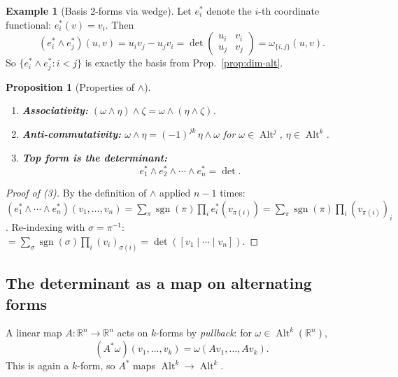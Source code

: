 \documentclass[11pt]{article}
\theoremstyle{definition}
\newtheorem{example}{Example}[section]
\theoremstyle{plain}
\newtheorem{proposition}{Proposition}[section]
\begin{document}
\begin{example}[Basis 2-forms via wedge]
  Let $e_i^*$ denote the $i$-th coordinate functional:
  $e_i^*(v) = v_i$.  Then
  \[
    (e_i^*\wedge e_j^*)(u,v)
    = u_iv_j - u_jv_i
    = \det\begin{pmatrix}u_i & v_i \\ u_j & v_j\end{pmatrix}
    = \omega_{\{i,j\}}(u,v).
  \]
  So $\{e_i^*\wedge e_j^* : i<j\}$ is exactly the basis from
  Prop.~\ref{prop:dim-alt}.
\end{example}

\begin{proposition}[Properties of $\wedge$]
  \leavevmode
  \begin{enumerate}
    \item \textbf{Associativity:}
          $(\omega\wedge\eta)\wedge\zeta = \omega\wedge(\eta\wedge\zeta)$.
    \item \textbf{Anti-commutativity:}
          $\omega\wedge\eta = (-1)^{jk}\,\eta\wedge\omega$
          for $\omega\in\operatorname{Alt}^j$, $\eta\in\operatorname{Alt}^k$.
    \item \textbf{Top form is the determinant:}
          \[
            e_1^*\wedge e_2^*\wedge\cdots\wedge e_n^* = \det.
          \]
  \end{enumerate}
\end{proposition}
\begin{proof}[Proof of (3)]
  By the definition of $\wedge$ applied $n-1$ times:
  $(e_1^*\wedge\cdots\wedge e_n^*)(v_1,\ldots,v_n)
  = \sum_\pi \operatorname{sgn}(\pi)\prod_i e_i^*(v_{\pi(i)})
  = \sum_\pi \operatorname{sgn}(\pi)\prod_i (v_{\pi(i)})_i$.
  Re-indexing with $\sigma=\pi^{-1}$:
  $= \sum_\sigma \operatorname{sgn}(\sigma)\prod_i (v_i)_{\sigma(i)}
  = \det([v_1\mid\cdots\mid v_n])$.
\end{proof}

\subsection{The determinant as a map on alternating forms}

A linear map $A:\mathbb{R}^n\to\mathbb{R}^n$ acts on $k$-forms by
\emph{pullback}: for $\omega\in\operatorname{Alt}^k(\mathbb{R}^n)$,
\[
  (A^*\omega)(v_1,\ldots,v_k) = \omega(Av_1,\ldots,Av_k).
\]
This is again a $k$-form, so $A^*$ maps
$\operatorname{Alt}^k\to\operatorname{Alt}^k$.
\end{document}
